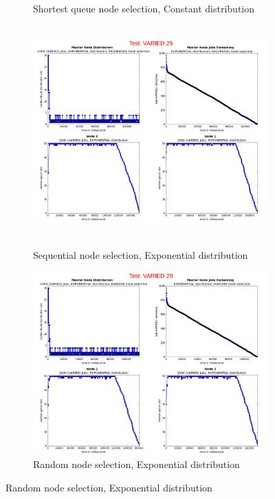 \documentclass{article}
\begin{document}
\begin{figure}[p]
\begin{subfigure}[b]{0.5\linewidth}
    \caption{Shortest queue node selection, Constant distribution} 
    \label{testVaried21} 
    \vspace{4ex}
  \end{subfigure} 
  
  
  \begin{subfigure}[b]{0.5\linewidth}
    \centering
    \hbox{\hspace{-5.0em} \includegraphics[width=1.2\linewidth]{combined_varied_overview/case_varied_25} }
    \caption{Sequential node selection, Exponential distribution} 
    \label{testVaried25} 
    \vspace{4ex}
  \end{subfigure}%
  \begin{subfigure}[b]{0.5\linewidth}
    \centering
    \includegraphics[width=1.2\linewidth]{combined_varied_overview/case_varied_29} 
    \caption{Random node selection, Exponential distribution} 
    \label{testVaried29} 
    \vspace{4ex}
  \end{subfigure} 
  

\end{figure}
\end{document}
